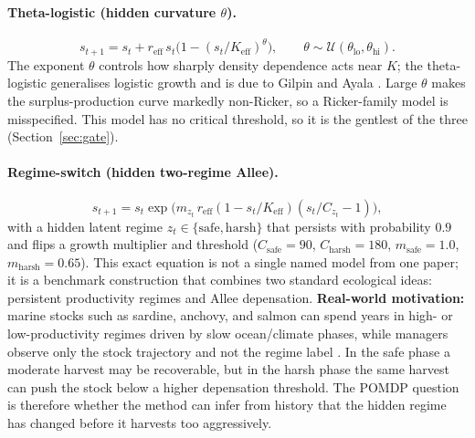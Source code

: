 \documentclass[11pt]{article}
\begin{document}
\paragraph{Theta-logistic (hidden curvature $\theta$).}
\begin{equation}
s_{t+1} = s_t + r_{\text{eff}}\, s_t\big(1 - (s_t/K_{\text{eff}})^{\theta}\big),
\qquad \theta \sim \mathcal{U}(\theta_{\text{lo}}, \theta_{\text{hi}}).
\end{equation}
The exponent $\theta$ controls how sharply density dependence acts near $K$; the
theta-logistic generalises logistic growth and is due to Gilpin and Ayala
\cite{gilpin1973}. Large $\theta$ makes the surplus-production curve markedly non-Ricker,
so a Ricker-family model is misspecified. This model has no critical threshold, so it is
the gentlest of the three (Section~\ref{sec:gate}).

\paragraph{Regime-switch (hidden two-regime Allee).}
\begin{equation}
s_{t+1} = s_t \exp\!\big(m_{z_t}\, r_{\text{eff}}(1 - s_t/K_{\text{eff}})(s_t/C_{z_t} - 1)\big),
\end{equation}
with a hidden latent regime $z_t \in \{\text{safe},\text{harsh}\}$ that persists with
probability $0.9$ and flips a growth multiplier and threshold
($C_{\text{safe}}{=}90$, $C_{\text{harsh}}{=}180$, $m_{\text{safe}}{=}1.0$,
$m_{\text{harsh}}{=}0.65$). This exact equation is not a single named model from one
paper; it is a benchmark construction that combines two standard ecological ideas:
persistent productivity regimes and Allee depensation. \textbf{Real-world motivation:}
marine stocks such as sardine, anchovy, and salmon can spend years in high- or
low-productivity regimes driven by slow ocean/climate phases, while managers observe only
the stock trajectory and not the regime label \cite{vertpre2013,scheffer2001}. In the safe
phase a moderate harvest may be recoverable, but in the harsh phase the same harvest can
push the stock below a higher depensation threshold. The POMDP question is therefore
whether the method can infer from history that the hidden regime has changed before it
harvests too aggressively.
\end{document}
